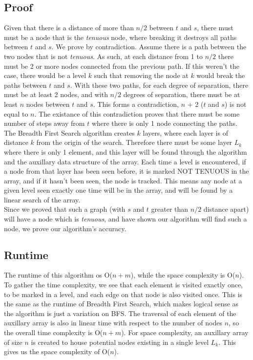 \documentclass[titlepage]{article}
\numberwithin{equation}{subsection}
\begin{document}
\subsection{Proof}
Given that there is a distance of more than $n/2$ between $t$ and 
$s$, there must must be a node that is the \textit{tenuous} node,
where breaking it destroys all paths between $t$ and $s$. We prove by
contradiction. Assume there is a path between the two nodes that is not
\textit{tenuous}. As such, at each distance from 1 to $n/2$ there must be 
2 or more nodes connected from the previous path. If this weren't the case,
there would be a level $k$ such that removing the node at $k$ would break
the paths between $t$ and $s$. With these two paths, for each degree of
separation, there must be at least 2 nodes, and with $n/2$ degrees of
separation, there must be at least $n$ nodes between $t$ and $s$. This
forms a contradiction, $n$ + 2 ($t$ and $s$) is not equal to $n$. The existance
of this contradiction proves that there must be some number of steps away from
$t$ where there is only 1 node connecting the paths. The Breadth First Search
algorithm creates $k$ layers, where each layer is of distance $k$ from the origin
of the search. Therefore there must be some layer $L_k$ where there is only
1 element, and this layer will be found through the algorithm and the auxillary
data structure of the array. Each time a level is encountered, if a node from that
layer has been seen before, it is marked NOT TENUOUS in the array, and if it hasn't
been seen, the node is tracked. This means any node at a given level seen exactly
one time will be in the array, and will be found by a linear search of the array.
\\ Since we proved that such a graph (with $s$ and $t$ greater than $n/2$ distance apart)
will have a node which is \textit{tenuous}, and have shown our algorithm will find
such a node, we prove our algorithm's accuracy.
\subsection{Runtime}
The runtime of this algorithm os O($n + m$), while the space complexity is
O($n$). To gather the time complexity, we see that each element is visited exactly once, to
be marked in a level, and each edge on that node is also visited once. This is the same
as the runtime of Breadth First Search, which makes logical sense as the algorithm is just
a variation on BFS. The traversal of each element of the auxillary array is also in linear
time with respect to the number of nodes $n$, so the overall time complexity is O($n+m$).
For space complexity, an auxillary array of size $n$ is created to house potential 
nodes existing in a single level $L_k$. This gives us the space complexity of O($n$).
\end{document}
